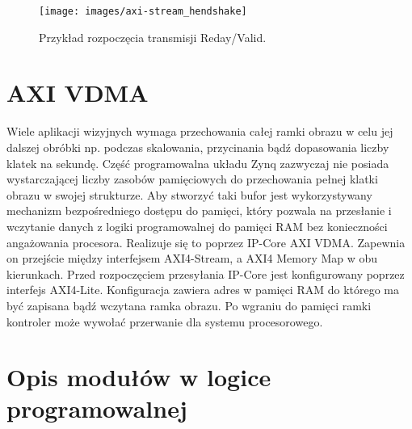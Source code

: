 \begin{figure}[h]
\centering
\texttt{[image: images/axi-stream\_hendshake]}
\caption{Przykład rozpoczęcia transmisji Reday/Valid.}
\label{fig:handshake}
\end{figure}

\section{AXI VDMA}
Wiele aplikacji wizyjnych wymaga przechowania całej ramki obrazu w celu jej dalszej obróbki np. podczas skalowania, przycinania bądź dopasowania liczby klatek na sekundę.
Część programowalna układu Zynq zazwyczaj nie posiada wystarczającej liczby zasobów pamięciowych do przechowania pełnej klatki obrazu w swojej strukturze.
Aby stworzyć taki bufor jest wykorzystywany mechanizm bezpośredniego dostępu do pamięci, który pozwala na przesłanie i wczytanie danych z logiki programowalnej do pamięci RAM bez konieczności angażowania procesora.
Realizuje się to poprzez IP-Core AXI VDMA.
Zapewnia on przejście między interfejsem AXI4-Stream, a AXI4 Memory Map w obu kierunkach.
Przed rozpoczęciem przesyłania IP-Core jest konfigurowany poprzez interfejs AXI4-Lite.
Konfiguracja zawiera adres w pamięci RAM do którego ma być zapisana bądź wczytana ramka obrazu.
Po wgraniu do pamięci ramki kontroler może wywołać przerwanie dla systemu procesorowego.
\section{Opis modułów w logice programowalnej}
